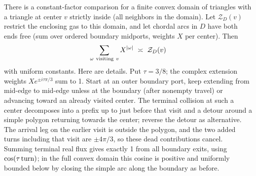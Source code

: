 There is a constant-factor comparison for a finite convex domain of triangles with a triangle at center \(v\) strictly inside (all neighbors in the domain). Let \(\mathcal Z_D(v)\) restrict the enclosing gas to this domain, and let chordal arcs in \(D\) have both ends free (sum over ordered boundary midports, weights \(X\) per center). Then
\begin{equation}
  \sum_{\omega\ {\rm visiting}\ v} X^{|\omega|}\ \asymp\ \mathcal Z_D(v)\label{L:eq6}
\end{equation}
with uniform constants. Here are details. Put \(\tau=3/8\); the complex extension weights \(X e^{\pm i\tau\pi/3}\) sum to 1. Start at an outer boundary port, keep extending from mid-edge to mid-edge unless at the boundary (after nonempty travel) or advancing toward an already visited center. The terminal collision at such a center decomposes into a prefix up to just before that visit and a detour around a simple polygon returning towards the center; reverse the detour as alternative. The arrival leg on the earlier visit is outside the polygon, and the two added turns including that visit are \(\pm4\pi/3\), so these dead contributions cancel. Summing terminal real flux gives exactly 1 from all boundary exits, using \(\cos(\tau\,{\rm turn})\); in the full convex domain this cosine is positive and uniformly bounded below by closing the simple arc along the boundary as before.

